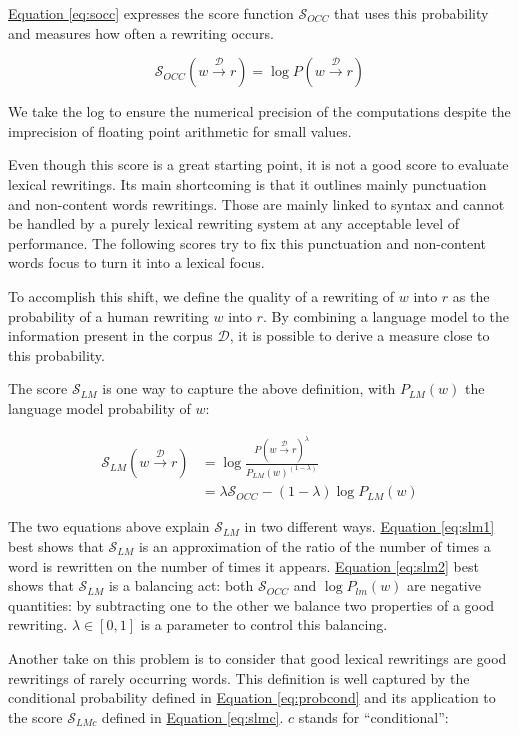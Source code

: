 \documentclass[a4paper, 11pt, onepage]{scrreprt}
\newcommand\equaref[1]{\hyperref[#1]{Equation \ref*{#1}}}
\newcommand\maps[1]{\xrightarrow{\mathcal{#1}}}
\newcommand\proba[2][]{P_{#1} \left( #2 \right)}
\begin{document}
\equaref{eq:socc} expresses the score function $\mathcal{S}_{OCC}$
that uses this probability and measures how often a rewriting occurs.

\begin{equation}
  \label{eq:socc}
  \mathcal{S}_{OCC}(w \maps{D} r) = \log \proba{w \maps{D} r}
\end{equation}

We take the log to ensure the numerical precision of the computations
despite the imprecision of floating point arithmetic for small values.

Even though this score is a great starting point, it is not a good
score to evaluate lexical rewritings. Its main shortcoming is that it
outlines mainly punctuation and non-content words rewritings. Those
are mainly linked to syntax and cannot be handled by a purely lexical
rewriting system at any acceptable level of performance. The following
scores try to fix this punctuation and non-content words focus to turn
it into a lexical focus.

To accomplish this shift, we define the quality of a rewriting of $w$
into $r$ as the probability of a human rewriting $w$ into $r$. By
combining a language model to the information present in the corpus
$\mathcal{D}$, it is possible to derive a measure close to this
probability.

The score $\mathcal{S}_{LM}$ is one way to capture the above
definition, with $\proba[LM]{w}$ the language model probability of
$w$:

\begin{align}
  \label{eq:slm1}
  \mathcal{S}_{LM}(w \maps{D} r) & = \log \frac{\proba{w \maps{D} r}^\lambda}%
  {\proba[LM]{w}^{(1 - \lambda)}} \\
  \label{eq:slm2}
  & = \lambda \mathcal{S}_{OCC} - (1 - \lambda) \log \proba[LM]{w}
\end{align}

The two equations above explain $\mathcal{S}_{LM}$ in two different
ways. \equaref{eq:slm1} best shows that $\mathcal{S}_{LM}$ is an
approximation of the ratio of the number of times a word is rewritten
on the number of times it appears. \equaref{eq:slm2} best shows that
$\mathcal{S}_{LM}$ is a balancing act: both $\mathcal{S}_{OCC}$ and
$\log \proba[lm]{w}$ are negative quantities: by subtracting one to
the other we balance two properties of a good rewriting. $\lambda \in
\left[0,1\right]$ is a parameter to control this balancing.

Another take on this problem is to consider that good lexical
rewritings are good rewritings of rarely occurring words. This
definition is well captured by the conditional probability defined in
\equaref{eq:probcond} and its application to the score
$\mathcal{S}_{LMc}$ defined in \equaref{eq:slmc}. $c$ stands for
“conditional”:
\end{document}
